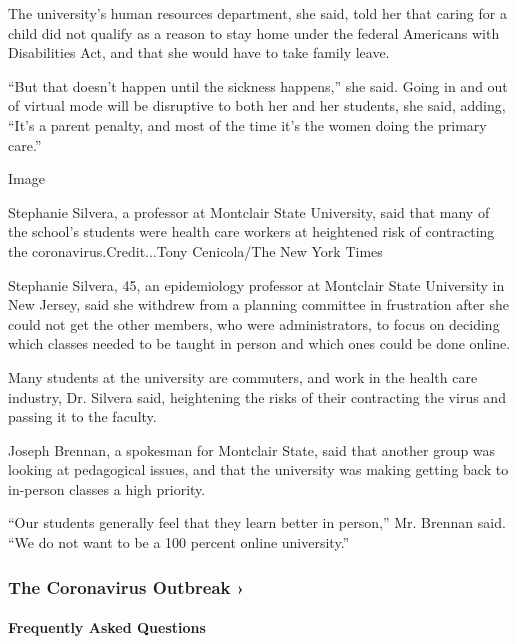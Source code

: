 The university's human resources department, she said, told her that
caring for a child did not qualify as a reason to stay home under the
federal Americans with Disabilities Act, and that she would have to take
family leave.

``But that doesn't happen until the sickness happens,'' she said. Going
in and out of virtual mode will be disruptive to both her and her
students, she said, adding, ``It's a parent penalty, and most of the
time it's the women doing the primary care.''

Image

Stephanie Silvera, a professor at Montclair State University, said that
many of the school's students were health care workers at heightened
risk of contracting the coronavirus.Credit...Tony Cenicola/The New York
Times

Stephanie Silvera, 45, an epidemiology professor at Montclair State
University in New Jersey, said she withdrew from a planning committee in
frustration after she could not get the other members, who were
administrators, to focus on deciding which classes needed to be taught
in person and which ones could be done online.

Many students at the university are commuters, and work in the health
care industry, Dr. Silvera said, heightening the risks of their
contracting the virus and passing it to the faculty.

Joseph Brennan, a spokesman for Montclair State, said that another group
was looking at pedagogical issues, and that the university was making
getting back to in-person classes a high priority.

``Our students generally feel that they learn better in person,'' Mr.
Brennan said. ``We do not want to be a 100 percent online university.''

\href{https://www.nytimes.com/news-event/coronavirus?action=click\&pgtype=Article\&state=default\&region=MAIN_CONTENT_3\&context=storylines_faq}{}

\hypertarget{the-coronavirus-outbreak-}{%
\subsubsection{The Coronavirus Outbreak
›}\label{the-coronavirus-outbreak-}}

\hypertarget{frequently-asked-questions}{%
\paragraph{Frequently Asked
Questions}\label{frequently-asked-questions}}

